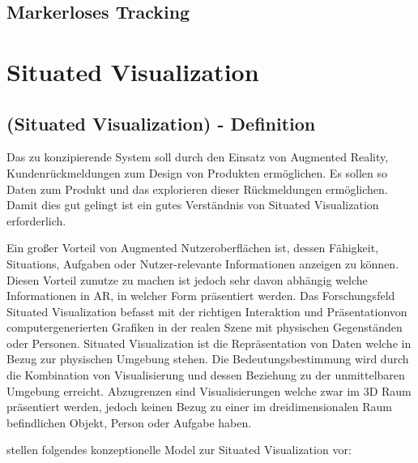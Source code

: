 
\subsection{Markerloses Tracking}



\section{Situated Visualization}

\subsection{(Situated Visualization) - Definition}

Das zu konzipierende System soll durch den Einsatz von Augmented Reality, Kundenrückmeldungen zum Design 
von Produkten ermöglichen. Es sollen so Daten zum Produkt und das explorieren dieser Rückmeldungen ermöglichen.
Damit dies gut gelingt ist ein gutes Verständnis von Situated Visualization erforderlich. 

\cite[S.~239]{DieterSchmalstieg2016} Ein großer Vorteil von Augmented Nutzeroberflächen ist, dessen Fähigkeit, 
Situations, Aufgaben oder Nutzer-relevante Informationen anzeigen zu können. Diesen Vorteil zunutze zu machen ist 
jedoch sehr davon abhängig welche Informationen in AR, in welcher Form  präsentiert werden. Das Forschungsfeld 
Situated Visualization befasst mit der richtigen Interaktion und Präsentationvon computergenerierten Grafiken in der 
realen Szene mit physischen Gegenständen oder Personen. \cite[S.~188]{ElSayedNevenA.M.BruceH.ThomasRossT.Smith2015} 
Situated Visualization ist die Repräsentation von Daten welche in Bezug zur physischen Umgebung stehen. 
Die Bedeutungsbestimmung wird durch die Kombination von Visualisierung und dessen Beziehung zu der unmittelbaren Umgebung erreicht. \cite[S.~240]{DieterSchmalstieg2016} Abzugrenzen sind Visualisierungen welche zwar im 3D Raum präsentiert werden, jedoch keinen Bezug zu einer im dreidimensionalen Raum befindlichen Objekt, Person oder Aufgabe haben.

\cite[S.~192]{ElSayedNevenA.M.BruceH.ThomasRossT.Smith2015} \cite[S.~2]{WesleyWillettYvonneJansen} stellen folgendes konzeptionelle Model zur Situated Visualization vor:

